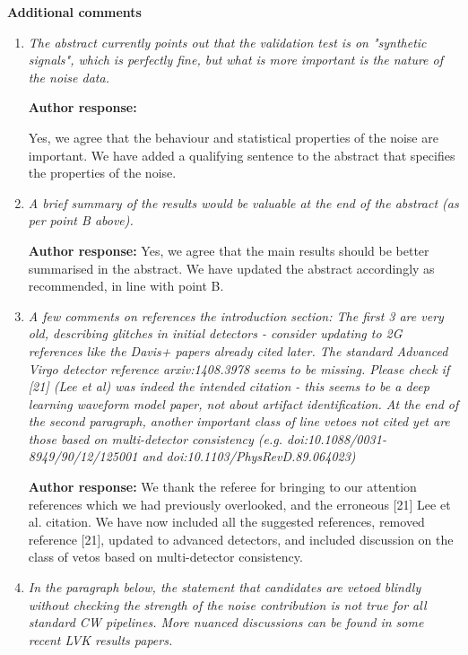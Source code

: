 \documentclass[10pt]{article}
\begin{document}
\noindent \textbf{Additional comments}




\begin{enumerate}
	\item \textit{The abstract currently points out that the validation test is on "synthetic  
		signals", which is perfectly fine, but what is more important is the nature of  
		the noise data.}
	
			\textbf{Author response:} 
	
Yes, we agree that the behaviour and statistical properties of the noise are important. We have added a qualifying sentence to the abstract that specifies the properties of the noise.  
	
	\item \textit{A brief summary of the results would be valuable at the end of the abstract  
		(as per point B above). }
	
	\textbf{Author response:}  \newline 
	Yes, we agree that the main results should be better summarised in the abstract. We have updated the abstract accordingly as recommended, in line with point B.
	
	\item \textit{A few comments on references the introduction section:  
		The first 3 are very old, describing glitches in initial detectors - consider  
		updating to 2G references like the Davis+ papers already cited later.  
		The standard Advanced Virgo detector reference arxiv:1408.3978 seems to be  
		missing.  
		Please check if [21] (Lee et al) was indeed the intended citation - this seems  
		to be a deep learning waveform model paper, not about artifact identification.  
		At the end of the second paragraph, another important class of line vetoes not  
		cited yet are those based on multi-detector consistency (e.g.  
		doi:10.1088/0031-8949/90/12/125001 and doi:10.1103/PhysRevD.89.064023)}
	
	
		\textbf{Author response:}  \newline 
	We thank the referee for bringing to our attention references which we had previously overlooked, and the erroneous [21] Lee et al. citation. We have now included all the suggested references, removed reference [21], updated to advanced detectors, and included discussion on the class of vetos based on multi-detector consistency.
	
	\item \textit{In the paragraph below, the statement that candidates are vetoed blindly  
		without checking the strength of the noise contribution is not true for all  
		standard CW pipelines. More nuanced discussions can be found in some recent LVK  
		results papers.}
	

\end{enumerate}
\end{document}
